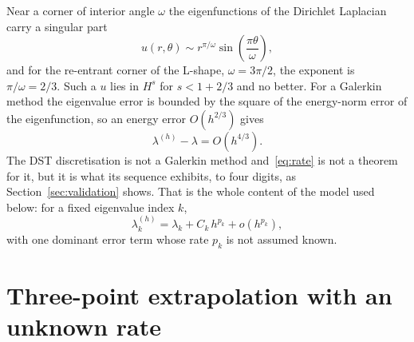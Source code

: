 \documentclass[11pt,a4paper]{article}
\begin{document}
Near a corner of interior angle $\omega$ the eigenfunctions of the Dirichlet
Laplacian carry a singular part
\begin{equation}
  u(r,\theta) \sim r^{\pi/\omega} \sin\!\left(\frac{\pi\theta}{\omega}\right),
\end{equation}
and for the re-entrant corner of the L-shape, $\omega = 3\pi/2$, the exponent is
$\pi/\omega = 2/3$. Such a $u$ lies in $H^{s}$ for $s < 1 + 2/3$ and no better.
For a Galerkin method the eigenvalue error is bounded by the square of the
energy-norm error of the eigenfunction, so an energy error $O(h^{2/3})$ gives
\begin{equation}
  \lambda^{(h)} - \lambda = O\!\left(h^{4/3}\right).
  \label{eq:rate}
\end{equation}
The DST discretisation is not a Galerkin method and~\eqref{eq:rate} is not a
theorem for it, but it is what its sequence exhibits, to four digits, as
Section~\ref{sec:validation} shows. That is the whole content of the model used
below: for a fixed eigenvalue index $k$,
\begin{equation}
  \lambda_k^{(h)} = \lambda_k + C_k\,h^{p_k} + o\!\left(h^{p_k}\right),
  \label{eq:model}
\end{equation}
with one dominant error term whose rate $p_k$ is not assumed known.

\section{Three-point extrapolation with an unknown rate}
\end{document}
